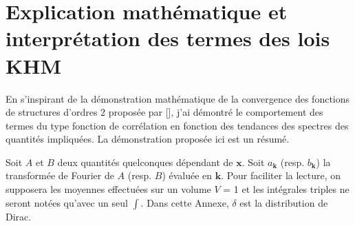 \chapter{Explication mathématique et interprétation des termes des lois \acs{KHM}}
\renewcommand\partie{\Partie\ Chapitre \thechapter}
\label{an:A}

En s'inspirant de la démonstration mathématique de la convergence des fonctions de structures d'ordres 2 proposée par [\cite{cho_simulations_2009}], j'ai démontré le comportement des termes du type fonction de corrélation en fonction des tendances des spectres des quantités impliquées. La démonstration proposée ici est un résumé. 

Soit $A$ et $B$ deux quantités quelconques dépendant de $\mathbf{x}$.
Soit $a_{\boldsymbol{k}}$ (resp. $b_{\boldsymbol{k}}$) la transformée de Fourier de $A$ (resp. $B$) évaluée en  $\boldsymbol{k}$. Pour faciliter la lecture, on supposera les moyennes effectuées sur un volume $V$ = 1 et les intégrales triples ne seront notées qu'avec un seul $\int$. Dans cette Annexe, $\delta$ est la distribution de Dirac. 

